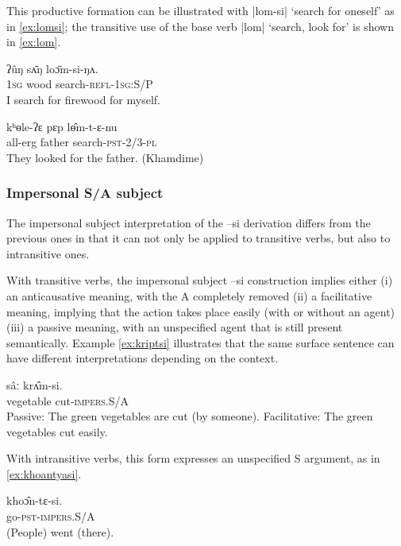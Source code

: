 \documentclass[twoside,a4paper,11pt]{article}
\newcommand{\ipa}[1]{{\phon#1}}
\begin{document}
This  productive formation can be illustrated with |\ipa{lom-si}| `search for oneself' as in \ref{ex:lomsi}; the transitive use of the base verb |\ipa{lom}| `search, look for' is shown in \ref{ex:lom}.

\begin{exe}
\ex \label{ex:lomsi} 
\gll
\ipa{ʔûŋ}  	\ipa{sʌ̄ŋ}  	\ipa{loɔ̄m-si-ŋʌ.}  \\
\textsc{1sg} wood search-\textsc{refl-1sg:S/P} \\
\glt I search for firewood for myself.
 \end{exe}
 
 \begin{exe}
\ex \label{ex:lom} 
\gll
 \ipa{kʰɵle-ʔɛ}  	\ipa{pɛp}  	\ipa{lɵ̂m-t-ɛ-nu}  \\
 all-erg father search-\textsc{pst-2/3-pl} \\
 \glt They looked for the father. (Khamdime)
 \end{exe}
 

\subsubsection{Impersonal S/A subject} 
The impersonal subject interpretation of the \ipa{--si} derivation differs from the previous ones in that it can not only be applied to transitive verbs, but also to intransitive ones.

With transitive verbs, the impersonal subject \ipa{--si} construction implies either (i) an anticausative meaning, with the A completely removed (ii) a facilitative meaning, implying that the action takes place easily (with or without an agent) (iii) a passive meaning, with an unspecified agent that is still present semantically. Example \ref{ex:kriptsi} illustrates that the same surface sentence can have different interpretations depending on the context. 
   
   \begin{exe}
\ex \label{ex:kriptsi} 
\gll 
 \ipa{sâː}  	\ipa{krʌ̂m-si.}  \\
 vegetable cut-\textsc{impers.S/A} \\
\glt Passive: The green vegetables are cut (by someone).
\glt Facilitative: The green vegetables cut easily.
\end{exe}
 
 With intransitive verbs, this form expresses an unspecified S argument, as in \ref{ex:khoantyasi}.
 
    \begin{exe}
\ex \label{ex:khoantyasi} 
\gll 
 \ipa{khoɔ̂n-tɛ-si.}  \\
go-\textsc{pst-impers.S/A} \\
\glt (People) went (there).
\end{exe}
\end{document}
